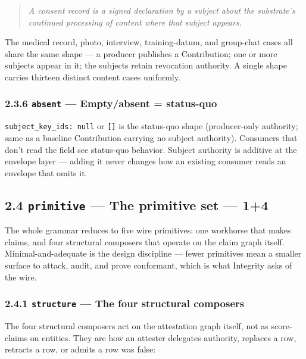\documentclass[11pt]{article}
\begin{document}
\begin{quote}\itshape A consent record is a signed declaration by a subject about the substrate's continued processing of content where that subject appears.\end{quote}


The medical record, photo, interview, training-datum, and group-chat cases all share the same shape — a producer publishes a Contribution; one or more subjects appear in it; the subjects retain revocation authority. A single shape carries thirteen distinct content cases uniformly.


\subsubsection*{2.3.6 \texttt{absent} — Empty/absent = status-quo}


\texttt{subject\_key\_ids: null} or \texttt{[]} is the status-quo shape (producer-only authority; same as a baseline Contribution carrying no subject authority). Consumers that don't read the field see status-quo behavior. Subject authority is additive at the envelope layer — adding it never changes how an existing consumer reads an envelope that omits it.


\subsection*{2.4 \texttt{primitive} — The primitive set — 1+4}


The whole grammar reduces to five wire primitives: one workhorse that makes claims, and four structural composers that operate on the claim graph itself. Minimal-and-adequate is the design discipline — fewer primitives mean a smaller surface to attack, audit, and prove conformant, which is what Integrity asks of the wire.


\subsubsection*{2.4.1 \texttt{structure} — The four structural composers}


The four structural composers act on the attestation graph itself, not as score-claims on entities. They are how an attester delegates authority, replaces a row, retracts a row, or admits a row was false:
\end{document}
